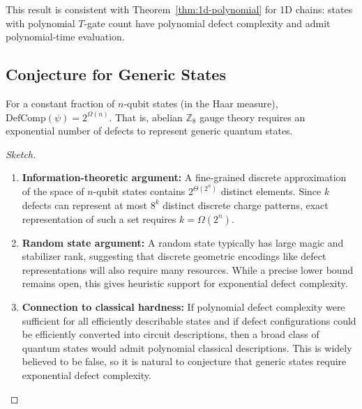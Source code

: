 \begin{remark}
This result is consistent with Theorem~\ref{thm:1d-polynomial} for 1D chains: states with polynomial $T$-gate count have polynomial defect complexity and admit polynomial-time evaluation.
\end{remark}

\subsection{Conjecture for Generic States}

\begin{conjecture}
For a constant fraction of $n$-qubit states (in the Haar measure), $\text{DefComp}(\psi) = 2^{\Omega(n)}$. That is, abelian $\mathbb{Z}_8$ gauge theory requires an exponential number of defects to represent generic quantum states.
\end{conjecture}

\begin{proof}[Sketch]
\begin{enumerate}
    \item \textbf{Information-theoretic argument:} A fine-grained discrete approximation of the space of $n$-qubit states contains $2^{\Theta(2^n)}$ distinct elements. Since $k$ defects can represent at most $8^k$ distinct discrete charge patterns, exact representation of such a set requires $k = \Omega(2^n)$.
    
    \item \textbf{Random state argument:} A random state typically has large magic and stabilizer rank, suggesting that discrete geometric encodings like defect representations will also require many resources. While a precise lower bound remains open, this gives heuristic support for exponential defect complexity.
    
    \item \textbf{Connection to classical hardness:} If polynomial defect complexity were sufficient for all efficiently describable states and if defect configurations could be efficiently converted into circuit descriptions, then a broad class of quantum states would admit polynomial classical descriptions. This is widely believed to be false, so it is natural to conjecture that generic states require exponential defect complexity.
\end{enumerate}
\end{proof}


